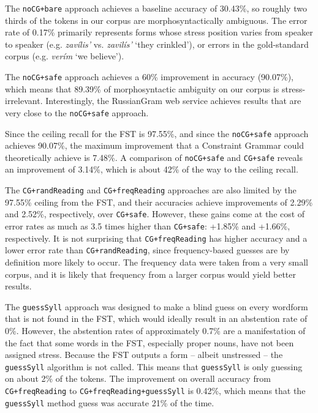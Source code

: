 \documentclass[11pt]{article}
\newcommand{\rr}[1]{\marginpar{\scriptsize R: #1}} %
\begin{document}
The {\small {\tt noCG+bare}} approach achieves a baseline accuracy of
30.43\%, so roughly two thirds of the tokens in our corpus are
morphosyntactically ambiguous. The error rate of 0.17\% primarily represents 
forms whose stress position varies from speaker to speaker (e.g.
\emph{zavílis'} vs. \emph{zavilís'} `they crinkled'), or errors in the gold-standard corpus 
(e.g. \emph{verím} `we believe').

The {\small {\tt noCG+safe}} approach
achieves a 60\% improvement in accuracy (90.07\%), which means that 89.39\% of 
morphosyntactic ambiguity on our corpus is stress-irrelevant. Interestingly, the 
RussianGram web service achieves results that are very close 
to the {\small {\tt noCG+safe}} approach.

Since the ceiling recall for the FST is 97.55\%, and since the 
{\small {\tt noCG+safe}} approach achieves 90.07\%, the maximum improvement 
that a Constraint Grammar could theoretically achieve is 7.48\%. A comparison
of {\small {\tt noCG+safe}} and {\small {\tt CG+safe}} reveals an improvement
of 3.14\%, which is about 42\% of the way to the ceiling recall.

The {\small {\tt CG+randReading}} and {\small {\tt CG+freqReading}} approaches are also 
limited by the 97.55\% ceiling from the FST, and their accuracies achieve
improvements of 2.29\% and 2.52\%, respectively, over {\small {\tt CG+safe}}.
However, these gains come at the cost of error rates as much as 3.5 times 
higher than {\small {\tt CG+safe}}: +1.85\% and +1.66\%, respectively. It is
not surprising that {\small {\tt CG+freqReading}} has higher accuracy and a lower
error rate than {\small {\tt CG+randReading}}, since frequency-based guesses are by
definition more likely to occur. The frequency data were taken from a very 
small corpus, and it is likely that frequency from a larger corpus would yield 
better results.

The {\small {\tt guessSyll}} approach was designed to make a blind guess on 
every wordform that is not found in the FST, which would ideally result in an
abstention rate of 0\%. However, the abstention rates of approximately 0.7\%
are a manifestation of the fact that some words in the FST, especially proper nouns, 
have not been assigned stress. Because the FST outputs a form -- albeit unstressed 
-- the {\small {\tt guessSyll}} algorithm is not called. This means that 
{\small {\tt guessSyll}} is only guessing on about 2\% of the tokens. The improvement
on overall accuracy from {\small {\tt CG+freqReading}} to 
{\small {\tt CG+freqReading+guessSyll}} is 0.42\%, which means that the 
{\small {\tt guessSyll}} method guess was accurate 21\% of the time.
\end{document}
